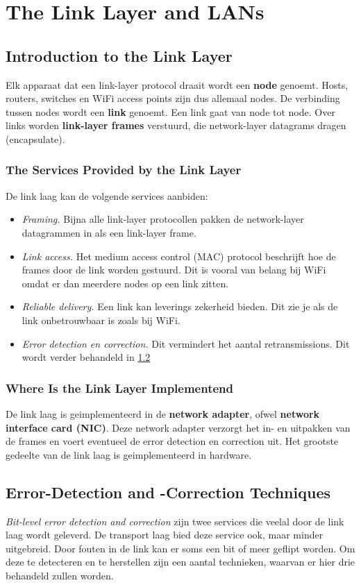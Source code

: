 \section{The Link Layer and LANs}
\subsection{Introduction to the Link Layer}
Elk apparaat dat een link-layer protocol draait wordt een \textbf{node} genoemt. Hosts, routers, switches en WiFi access points zijn dus allemaal nodes.
De verbinding tussen nodes wordt een \textbf{link} genoemt. Een link gaat van node tot node.
Over links worden \textbf{link-layer frames} verstuurd, die network-layer datagrams dragen (encapsulate).
\subsubsection{The Services Provided by the Link Layer}
De link laag kan de volgende services aanbiden:
\begin{itemize}
	\item \textit{Framing.} Bijna alle link-layer protocollen pakken de network-layer datagrammen in als een link-layer frame.
	\item \textit{Link access.} Het medium access control (MAC) protocol beschrijft hoe de frames door de link worden gestuurd. 
	Dit is vooral van belang bij WiFi omdat er dan meerdere nodes op een link zitten.
	\item \textit{Reliable delivery.} Een link kan leverings zekerheid bieden. Dit zie je als de link onbetrouwbaar is zoals bij WiFi.
	\item \textit{Error detection en correction.} Dit vermindert het aantal retransmissions. Dit wordt verder behandeld in \ref{EDC}
\end{itemize}
\subsubsection{Where Is the Link Layer Implementend}
De link laag is geimplementeerd in de \textbf{network adapter}, ofwel \textbf{network interface card (NIC)}. 
Deze network adapter verzorgt het in- en uitpakken van de frames en voert eventueel de error detection en correction uit.
Het grootste gedeelte van de link laag is geimplementeerd in hardware.


\subsection{Error-Detection and -Correction Techniques} \label{EDC}
\textit{Bit-level error detection and correction} zijn twee services die veelal door de link laag wordt geleverd. De transport laag bied deze service ook, maar minder uitgebreid.
Door fouten in de link kan er soms een bit of meer geflipt worden. Om deze te detecteren en te herstellen zijn een aantal technieken, waarvan er hier drie behandeld zullen worden.

